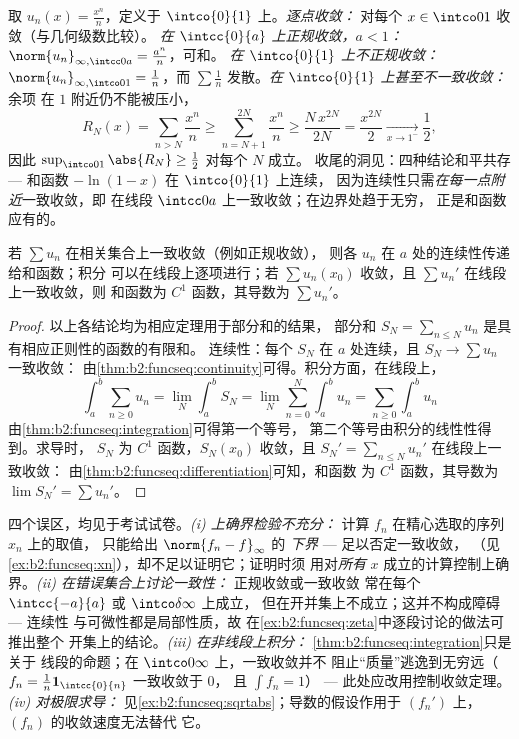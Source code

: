\begin{example}[同一级数的三种结论]\label{ex:b2:funcseq:threemodes}
取 $u_n(x) = \frac{x^n}{n}$，定义于 $\intco{0}{1}$ 上。\emph{逐点收敛：}
对每个 $x \in \intco01$ 收敛（与几何级数比较）。
\emph{在 $\intcc{0}{a}$ 上正规收敛，$a < 1$：}
$\norm{u_n}_{\infty,\intcc0a} = \frac{a^n}{n}$，可和。
\emph{在 $\intco{0}{1}$ 上不正规收敛：}
$\norm{u_n}_{\infty,\intco01} = \frac1n$，而 $\sum\frac1n$
发散。\emph{在 $\intco{0}{1}$ 上甚至不一致收敛：}余项
在 $1$ 附近仍不能被压小，
\[
R_N(x) = \sum_{n>N}\frac{x^n}{n}
\geq \sum_{n=N+1}^{2N}\frac{x^n}{n}
\geq \frac{N\,x^{2N}}{2N} = \frac{x^{2N}}{2}
\xrightarrow[x\to1^-]{} \frac12 ,
\]
因此 $\sup_{\intco01}\abs{R_N} \geq \frac12$ 对每个 $N$ 成立。
收尾的洞见：四种结论和平共存 ---
和函数 $-\ln(1-x)$ 在 $\intco{0}{1}$ 上连续，
因为连续性只需\emph{在每一点附近}一致收敛，即
在线段 $\intcc0a$ 上一致收敛；在边界处趋于无穷，
正是和函数应有的。
\end{example}

\begin{theorem}[级数的性质传递]\label{thm:b2:funcseq:seriestransfer}
若 $\sum u_n$ 在相关集合上一致收敛（例如正规收敛），
则各 $u_n$ 在 $a$ 处的连续性传递给和函数；积分
可以在线段上逐项进行；若 $\sum u_n(x_0)$
收敛，且 $\sum u_n'$ 在线段上一致收敛，则
和函数为 $C^1$ 函数，其导数为 $\sum u_n'$。
\end{theorem}

\begin{proof}
以上各结论均为相应定理用于部分和的结果，
部分和 $S_N = \sum_{n\leq N}u_n$ 是具有相应正则性的函数的有限和。
连续性：每个 $S_N$
在 $a$ 处连续，且 $S_N \to \sum u_n$ 一致收敛：
由\cref{thm:b2:funcseq:continuity}可得。积分方面，在线段上，
\[
\int_a^b \sum_{n\geq0} u_n
= \lim_N \int_a^b S_N
= \lim_N \sum_{n=0}^{N}\int_a^b u_n
= \sum_{n\geq0}\int_a^b u_n
\]
由\cref{thm:b2:funcseq:integration}可得第一个等号，
第二个等号由积分的线性性得到。求导时，
$S_N$ 为 $C^1$ 函数，$S_N(x_0)$ 收敛，且 $S_N' =
\sum_{n\leq N}u_n'$ 在线段上一致收敛：
由\cref{thm:b2:funcseq:differentiation}可知，和函数
为 $C^1$ 函数，其导数为 $\lim S_N' = \sum u_n'$。
\end{proof}

\begin{remark}[常见误区]
四个误区，均见于考试试卷。\emph{(i)
上确界检验不充分：} 计算 $f_n$ 在精心选取的序列 $x_n$ 上的取值，
只能给出 $\norm{f_n - f}_\infty$ 的
\emph{下界} --- 足以否定一致收敛，
（见\cref{ex:b2:funcseq:xn}），却不足以证明它；证明时须
用对\emph{所有} $x$ 成立的计算控制上确界。\emph{(ii)
在错误集合上讨论一致性：} 正规收敛或一致收敛
常在每个 $\intcc{-a}{a}$ 或 $\intco\delta\infty$ 上成立，
但在开并集上不成立；这并不构成障碍 --- 连续性
与可微性都是局部性质，故
在\cref{ex:b2:funcseq:zeta}中逐段讨论的做法可推出整个
开集上的结论。\emph{(iii) 在非线段上积分：}
\cref{thm:b2:funcseq:integration}只是关于
线段的命题；在 $\intco0\infty$ 上，一致收敛并不
阻止“质量”逃逸到无穷远（$f_n =
\frac1n\mathbf 1_{\intcc{0}{n}}$ 一致收敛于 $0$，
且 $\int f_n = 1$） --- 此处应改用控制收敛定理。
\emph{(iv) 对极限求导：}
见\cref{ex:b2:funcseq:sqrtabs}；导数的假设作用于
$(f_n')$ 上，$(f_n)$ 的收敛速度无法替代
它。
\end{remark}

